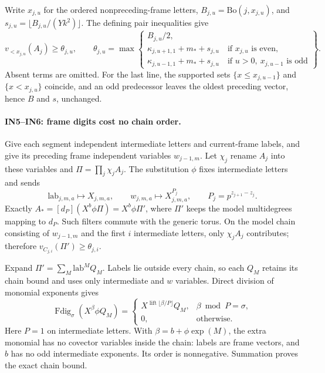 Write $x_{j,u}$ for the ordered nonpreceding-frame letters,
$B_{j,u}=\mathrm{Bo}(j,x_{j,u})$, and
$s_{j,u}=\lfloor B_{j,u}/(Yk^2)\rfloor$.  The defining pair inequalities give
\[
 v_{<x_{j,u}}(A_j)\geq\theta_{j,u},\qquad
 \theta_{j,u}=\max\left\{
 \begin{array}{l}
 B_{j,u}/2,\\
 \kappa_{j,u+1,1}+m_*+s_{j,u}\quad\text{if }x_{j,u}\text{ is even},\\
 \kappa_{j,u-1,1}+m_*+s_{j,u}\quad\text{if }u>0,
                         \ x_{j,u-1}\text{ is odd}
 \end{array}\right\}.
 \tag{IN4}
\]
Absent terms are omitted.  For the last line, the supported sets
$\{x\leq x_{j,u-1}\}$ and $\{x<x_{j,u}\}$ coincide, and an odd
predecessor leaves the oldest preceding vector, hence $B$ and $s$, unchanged.

\paragraph{IN5--IN6: frame digits cost no chain order.}
Give each segment independent intermediate letters and current-frame
labels, and give its preceding frame independent variables $w_{j-1,m}$.
Let $\chi_j$ rename $A_j$ into these variables and
$\Pi=\prod_j\chi_jA_j$.  The substitution $\phi$ fixes intermediate letters
and sends
\[
 \mathrm{lab}_{j,m,a}\mapsto X_{j,m,a},\qquad
 w_{j,m,a}\mapsto X_{j,m,a}^{P_j},\qquad
 P_j=p^{z_{j+1}-z_j}.
\]
Exactly $A_*=[d_P](X^b\phi\Pi)=X^b\phi\Pi'$, where $\Pi'$ keeps
the model multidegrees mapping to $d_P$.  Such filters commute with
the generic torus.  On the model chain consisting of $w_{j-1,m}$ and
the first $i$ intermediate letters, only $\chi_jA_j$ contributes; therefore
$v_{C_{j,i}}(\Pi')\geq\theta_{j,i}$.

Expand $\Pi'=\sum_M\mathrm{lab}^M Q_M$.  Labels lie outside every chain,
so each $Q_M$ retains its chain bound and uses only intermediate and $w$
variables.  Direct division of monomial exponents gives
\[
 \operatorname{Fdig}_{\sigma}(X^\beta\phi Q_M)=
 \begin{cases}
 X^{\operatorname{lift}\lfloor\beta/P\rfloor}Q_M,
                   &\beta\bmod P=\sigma,\\
 0,&\text{otherwise}.
 \end{cases}
 \tag{IN5}
\]
Here $P=1$ on intermediate letters.  With $\beta=b+\phi\!\operatorname{exp}(M)$,
the extra monomial has no covector variables inside the chain: labels
are frame vectors, and $b$ has no odd intermediate exponents.
Its order is nonnegative.  Summation proves the exact chain bound.

